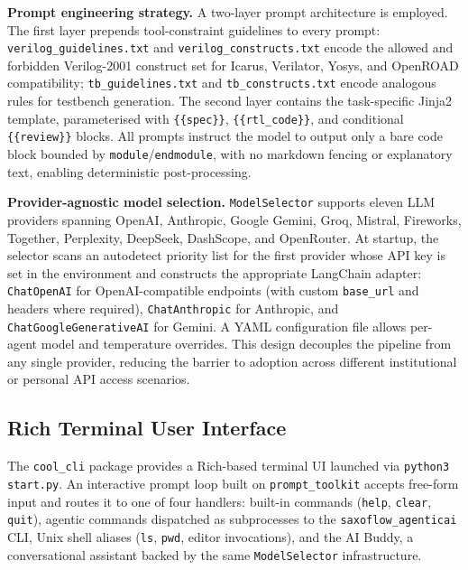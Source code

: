 \textbf{Prompt engineering strategy.}
A two-layer prompt architecture is employed. The first layer prepends
tool-constraint guidelines to every prompt: \texttt{verilog\_guidelines.txt}
and \texttt{verilog\_constructs.txt} encode the allowed and forbidden
Verilog-2001 construct set for Icarus, Verilator, Yosys, and OpenROAD
compatibility; \texttt{tb\_guidelines.txt} and \texttt{tb\_constructs.txt}
encode analogous rules for testbench generation. The second layer contains
the task-specific Jinja2 template, parameterised with \texttt{\{\{spec\}\}},
\texttt{\{\{rtl\_code\}\}}, and conditional \texttt{\{\{review\}\}} blocks.
All prompts instruct the model to output only a bare code block bounded by
\texttt{module}/\texttt{endmodule}, with no markdown fencing or explanatory
text, enabling deterministic post-processing.

\textbf{Provider-agnostic model selection.}
\texttt{ModelSelector} supports eleven \ac{LLM} providers spanning OpenAI,
Anthropic, Google Gemini, Groq, Mistral, Fireworks, Together, Perplexity,
DeepSeek, DashScope, and OpenRouter. At startup, the selector scans an
autodetect priority list for the first provider whose \ac{API} key is set
in the environment and constructs the appropriate LangChain adapter:
\texttt{ChatOpenAI} for OpenAI-compatible endpoints (with custom
\texttt{base\_url} and headers where required), \texttt{ChatAnthropic} for
Anthropic, and \texttt{ChatGoogleGenerativeAI} for Gemini. A \ac{YAML}
configuration file allows per-agent model and temperature overrides. This
design decouples the pipeline from any single provider, reducing the barrier
to adoption across different institutional or personal \ac{API} access
scenarios.

\subsection{Rich Terminal User Interface}
\label{ssec:tui}

The \texttt{cool\_cli} package provides a Rich-based terminal \ac{UI} launched
via \texttt{python3 start.py}. An interactive prompt loop built on
\texttt{prompt\_toolkit} accepts free-form input and routes it to one of four
handlers: built-in commands (\texttt{help}, \texttt{clear}, \texttt{quit}),
agentic commands dispatched as subprocesses to the \texttt{saxoflow\_agenticai}
\ac{CLI}, Unix shell aliases (\texttt{ls}, \texttt{pwd}, editor invocations),
and the AI Buddy, a conversational assistant backed by the same
\texttt{ModelSelector} infrastructure.


